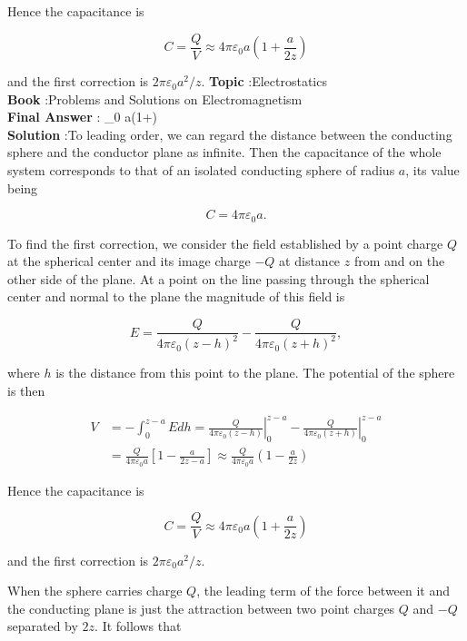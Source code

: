 \documentclass[10pt]{article}
\begin{document}
Hence the capacitance is

$$
C=\frac{Q}{V} \approx 4 \pi \varepsilon_{0} a\left(1+\frac{a}{2 z}\right)
$$

and the first correction is $2 \pi \varepsilon_{0} a^{2} / z$.
\textbf{Topic} :Electrostatics\\
\textbf{Book} :Problems and Solutions on Electromagnetism\\
\textbf{Final Answer} :  \pi \varepsilon_{0} a\left(1+\right)\\


\textbf{Solution} :To leading order, we can regard the distance between the conducting sphere and the conductor plane as infinite. Then the capacitance of the whole system corresponds to that of an isolated conducting sphere of radius $a$, its value being

$$
C=4 \pi \varepsilon_{0} a .
$$

 To find the first correction, we consider the field established by a point charge $Q$ at the spherical center and its image charge $-Q$ at distance $z$ from and on the other side of the plane. At a point on the line passing through the spherical center and normal to the plane the magnitude of this field is

$$
E=\frac{Q}{4 \pi \varepsilon_{0}(z-h)^{2}}-\frac{Q}{4 \pi \varepsilon_{0}(z+h)^{2}},
$$

where $h$ is the distance from this point to the plane. The potential of the sphere is then

$$
\begin{aligned}
V &=-\int_{0}^{z-a} E d h=\left.\frac{Q}{4 \pi \varepsilon_{0}(z-h)}\right|_{0} ^{z-a}-\left.\frac{Q}{4 \pi \varepsilon_{0}(z+h)}\right|_{0} ^{z-a} \\
&=\frac{Q}{4 \pi \varepsilon_{0} a}\left[1-\frac{a}{2 z-a}\right] \approx \frac{Q}{4 \pi \varepsilon_{0} a}\left(1-\frac{a}{2 z}\right)
\end{aligned}
$$

Hence the capacitance is

$$
C=\frac{Q}{V} \approx 4 \pi \varepsilon_{0} a\left(1+\frac{a}{2 z}\right)
$$

and the first correction is $2 \pi \varepsilon_{0} a^{2} / z$.

 When the sphere carries charge $Q$, the leading term of the force between it and the conducting plane is just the attraction between two point charges $Q$ and $-Q$ separated by $2 z$. It follows that
\end{document}
